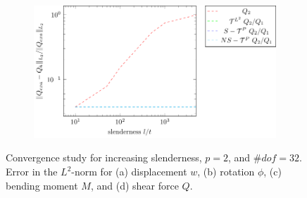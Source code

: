 \documentclass{article}
\begin{document}
\begin{figure}
\begin{subfigure}[b]{0.49\linewidth}
        \caption{}
        \vspace*{2mm}
    \end{subfigure}
    \begin{subfigure}[b]{0.49\linewidth}        %
        \centering
        \includegraphics[width=\linewidth]{slenderness_Q}
        \caption{}
        \vspace*{2mm}
    \end{subfigure}
    \caption{Convergence study for increasing slenderness, $p=2$, and $\#{dof}=32$. Error in the $L^2$-norm for (a) displacement $w$, (b) rotation $\phi$, (c) bending moment $M$, and (d) shear force $Q$.}
    \label{fig:slenderness}
\end{figure}
\end{document}
